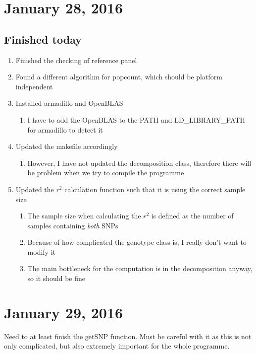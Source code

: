 \documentclass[12pt]{article}
\begin{document}
	\section{January 28, 2016}
	\subsection{Finished today}
	\begin{enumerate}
		\item Finished the checking of reference panel
		\item Found a different algorithm for popcount, which should be platform independent
		\item Installed armadillo and OpenBLAS
		\begin{enumerate}
			\item I have to add the OpenBLAS to the PATH and LD\_LIBRARY\_PATH for armadillo to detect it
		\end{enumerate}
		\item Updated the makefile accordingly
		\begin{enumerate}
			\item However, I have not updated the decomposition class, therefore there will be problem when we try to compile the programme
		\end{enumerate}
		\item Updated the $r^2$ calculation function such that it is using the correct sample size
		\begin{enumerate}
			\item The sample size when calculating the $r^2$ is defined as the number of samples containing \emph{both} SNPs
			\item Because of how complicated the genotype class is, I really don't want to modify it
			\item The main bottleneck for the computation is in the decomposition anyway, so it should be fine
		\end{enumerate}
		
	\end{enumerate}
	
	\section{January 29, 2016}
	Need to at least finish the getSNP function.
	Must be careful with it as this is not only complicated, but also extremely important for the whole programme.
\end{document}
